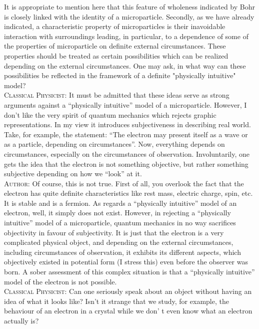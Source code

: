 \documentclass[a4paper,sfsidenotes,colorlinks=true]{tufte-book}
\numberwithin{equation}{section}
\numberwithin{figure}{section}
\begin{document}
It is appropriate to mention here that this feature of wholeness
indicated by Bohr is closely linked with the identity of a
microparticle. Secondly, as we have already indicated, a
characteristic property of microparticles is their inavoidable
interaction with surroundings leading, in particular, to a dependence
of some of the properties of microparticle on definite external
circumstances. These properties should be treated as certain
possibilities which can be realized depending on the external
circumstances. One may ask, in what way can these possibilities be
reflected in the framework of a definite "physically intuitive" model?
\\
\textsc{Classical Physicist:} It must be admitted that these ideas
serve as strong arguments against a ``physically intuitive'' model of
a microparticle. However, I don't like the very spirit of quantum
mechanics which rejects graphic representations. In my view it
introduces subjectiveness in describing real world. Take, for example,
the statement: ``The electron may present itself as a wave or as a
particle, depending on circumstances''. Now, everything depends on
circumstances, especially on the circumstances of
observation. Involuntarily, one gets the idea that the electron is not
something objective, but rather something subjective depending on how
we ``look'' at it.
\\
\textsc{Author:} Of course, this is not true. First of all, you
overlook the fact that the electron has quite definite characteristics
like rest mass, electric charge, spin, etc. It is stable and is a
fermion. As regards a ``physically intuitive'' model of an electron,
well, it simply does not exist. However, in rejecting a ``physically
intuitive'' model of a microparticle, quantum mechanics in no way
sacrifices objectivity in favour of subjectivity. It is just that the
electron is a very complicated physical object, and depending on the
external circumstances, including circumstances of observation, it
exhibits its different aspects, which objectively existed in potential
form (I stress this) even before the observer was born. A sober
assessment of this complex situation is that a ``physically
intuitive'' model of the electron is not possible.
\\
\textsc{Classical Physicist:} Can one seriously speak about an object
without having an idea of what it looks like? Isn't it strange that we
study, for example, the behaviour of an electron in a crystal while we
don' t even know what an electron actually is?
\\
\end{document}
